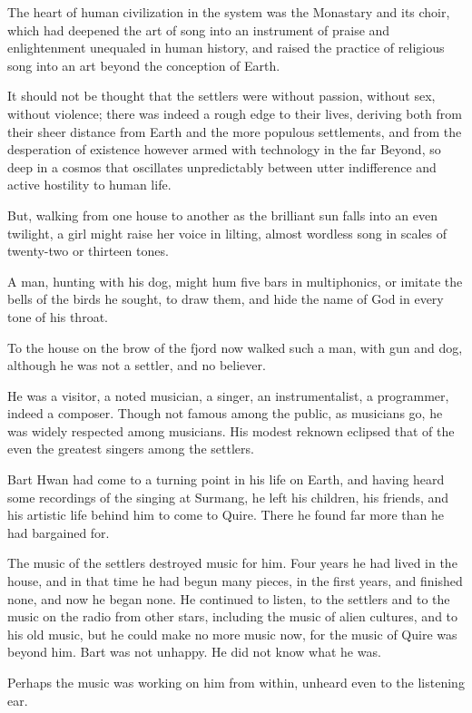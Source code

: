 \documentclass[english,11pt,letterpaper,onecolumn]{scrbook}
\begin{document}
	The heart of human civilization in the system was the Monastary and its choir, which had deepened the art of song into an instrument of praise and enlightenment unequaled in human history, and raised the practice of religious song into an art beyond the conception of Earth.

	It should not be thought that the settlers were without passion, without sex, without violence; there was indeed a rough edge to their lives, deriving both from their sheer distance from Earth and the more populous settlements, and from the desperation of existence however armed with technology in the far Beyond, so deep in a cosmos that oscillates unpredictably between utter indifference and active hostility to human life. 

	But, walking from one house to another as the brilliant sun falls into an even twilight, a girl might raise her voice in lilting, almost wordless song in scales of twenty-two or thirteen tones. 

	A man, hunting with his dog, might hum five bars in multiphonics, or imitate the bells of the birds he sought, to draw them, and hide the name of God in every tone of his throat.

	To the house on the brow of the fjord now walked such a man, with gun and dog, although he was not a settler, and no believer.

	He was a visitor, a noted musician, a singer, an instrumentalist, a programmer, indeed a composer. Though not famous among the public, as musicians go, he was widely respected among musicians. His modest reknown eclipsed that of the even the greatest singers among the settlers.

	Bart Hwan had come to a turning point in his life on Earth, and having heard some recordings of the singing at Surmang, he left his children, his friends, and his artistic life behind him to come to Quire. There he found far more than he had bargained for. 

	The music of the settlers destroyed music for him. Four years he had lived in the house, and in that time he had begun many pieces,  in the first years, and finished none, and now he began none. He continued to listen, to the settlers and to the music on the radio from other stars, including the music of alien cultures, and to his old music, but he could make no more music now, for the music of Quire was beyond him. Bart was not unhappy. He did not know what he was. 

	Perhaps the music was working on him from within, unheard even to the listening ear.
\end{document}
